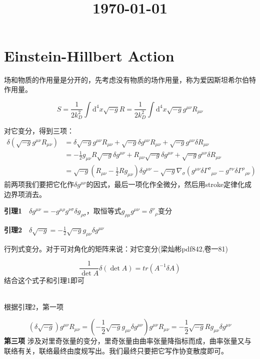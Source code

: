 \documentclass[UTF8]{article}
\title{\kaishu \\\small\today}
\date{}
\author{}
\newcommand{\dd}{\mathrm{d}}
\newcommand{\red}[1]{{\color{red}{#1}}}
\begin{document}
\section{Einstein-Hillbert Action}
	
场和物质的作用量是分开的，先考虑没有物质的场作用量，称为爱因斯坦希尔伯特作用量。

\begin{equation}\label{action}
	S=\frac{1}{2k_D^2}\int\dd^4x\sqrt{-g}R=\frac{1}{2k_D^2}\int\dd^4x\sqrt{-g}g^{\mu\nu}R_{\mu\nu}
\end{equation}

对它变分，得到三项：
\begin{align}
\delta(\sqrt{-g}g^{\mu\nu} R_{\mu\nu})&=\delta\sqrt{-g}g^{\mu\nu} R_{\mu\nu}+\sqrt{-g}\delta g^{\mu\nu} R_{\mu\nu}+\sqrt{-g}g^{\mu\nu} \delta R_{\mu\nu}\\
&=-\frac{1}{2}g_{\mu\nu}R\sqrt{-g}\delta g^{\mu\nu}+ R_{\mu\nu}\sqrt{-g}\delta g^{\mu\nu}+\sqrt{-g}g^{\mu\nu} \delta R_{\mu\nu}\\
&=\sqrt{-g}(R_{\mu\nu}-\frac{1}{2}Rg_{\mu\nu})\delta g^{\mu\nu}-\sqrt{-g}\nabla_{\sigma}(g^{\mu\nu}\delta{\Gamma^\sigma}_{\mu\nu}-g^{\sigma\nu}\delta{\Gamma^\rho}_{\rho\nu})
\end{align}
前两项我们要把它化作$ \delta g^{\mu\nu} $的因式，最后一项化作全微分，然后用stroke定律化成边界项消去。

\textbf{引理1}$\quad  \delta g^{\mu\nu}=-g^{\mu\rho}g^{\nu\sigma}\delta g_{\rho\sigma}$，取恒等式$ g_{\rho\mu}g^{\mu\nu}={\delta^\nu}_{\rho} $变分

\textbf{引理2}$ \quad \delta\sqrt{-g}=-\frac{1}{2}\sqrt{-g}g_{\mu\nu}\delta g^{\mu\nu} $

行列式变分。对于可对角化的矩阵来说：\red{$ \log\det A=tr \log A  $}对它变分(梁灿彬pdf842,卷一81)

\begin{equation}
	\frac{1}{\det A}\delta(\det A)=tr (A^{-1}\delta A)
\end{equation}
结合这个式子和引理1即可

~\\

根据引理2，第一项

\begin{equation}
	 (\delta \sqrt{-g})g^{\mu\nu}R_{\mu\nu}=(-\frac{1}{2}\sqrt{-g}g_{\mu\nu}\delta g^{\mu\nu} )g^{\mu\nu}R_{\mu\nu}=-\frac{1}{2}\sqrt{-g}Rg_{\mu\nu}\delta g^{\mu\nu} \label{2}
\end{equation}
\textbf{第三项} 涉及对里奇张量的变分，里奇张量由曲率张量降指标而成，曲率张量又与联络有关，联络最终由度规写出。我们最终只要把它写作协变散度即可。
\end{document}
